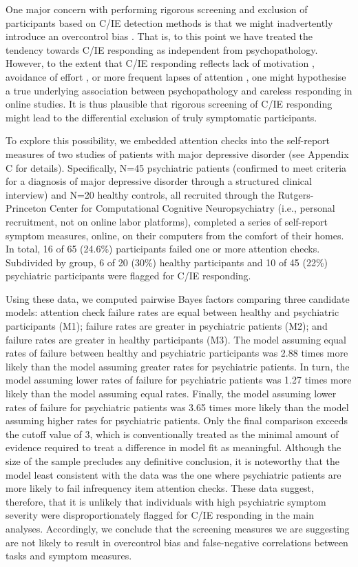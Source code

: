 \documentclass[a4paper,notitlepage,12pt]{article}
\begin{document}
\begin{refsection}[main]
One major concern with performing rigorous screening and exclusion of participants based on C/IE detection methods is that we might inadvertently introduce an overcontrol bias \cite{elwert2014endogenous}. That is, to this point we have treated the tendency towards C/IE responding as independent from psychopathology. However, to the extent that C/IE responding reflects lack of motivation \cite{barch2015mechanisms}, avoidance of effort \cite{cohen2001impairments, culbreth2016negative}, or more frequent lapses of attention \cite{kane2016individual, robison2017neurotic}, one might hypothesise a true underlying association between psychopathology and careless responding in online studies. It is thus plausible that rigorous screening of C/IE responding might lead to the differential exclusion of truly symptomatic participants. 

To explore this possibility, we embedded attention checks into the self-report measures of two studies of patients with major depressive disorder (see Appendix C for details). Specifically, N=45 psychiatric patients (confirmed to meet criteria for a diagnosis of major depressive disorder through a structured clinical interview) and N=20 healthy controls, all recruited through the Rutgers-Princeton Center for Computational Cognitive Neuropsychiatry (i.e., personal recruitment, not on online labor platforms), completed a series of self-report symptom measures, online, on their computers from the comfort of their homes. In total, 16 of 65 (24.6\%) participants failed one or more attention checks. Subdivided by group, 6 of 20 (30\%) healthy participants and 10 of 45 (22\%) psychiatric participants were flagged for C/IE responding.

Using these data, we computed pairwise Bayes factors comparing three candidate models: attention check failure rates are equal between healthy and psychiatric participants (M1); failure rates are greater in psychiatric patients (M2); and failure rates are greater in healthy participants (M3). The model assuming equal rates of failure between healthy and psychiatric participants was 2.88 times more likely than the model assuming greater rates for psychiatric patients. In turn, the model assuming lower rates of failure for psychiatric patients was 1.27 times more likely than the model assuming equal rates. Finally, the model assuming lower rates of failure for psychiatric patients was 3.65 times more likely than the model assuming higher rates for psychiatric patients. Only the final comparison exceeds the cutoff value of 3, which is conventionally treated as the minimal amount of evidence required to treat a difference in model fit as meaningful. Although the size of the sample precludes any definitive conclusion, it is noteworthy that the model least consistent with the data was the one where psychiatric patients are more likely to fail infrequency item attention checks. These data suggest, therefore, that it is unlikely that individuals with high psychiatric symptom severity were disproportionately flagged for C/IE responding in the main analyses. Accordingly, we conclude that the screening measures we are suggesting are not likely to result in overcontrol bias and false-negative correlations between tasks and symptom measures.


\end{refsection}
\end{document}
